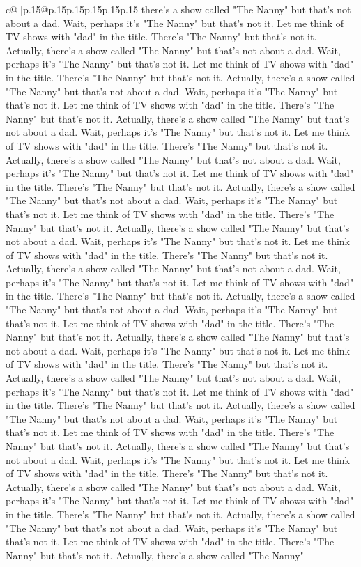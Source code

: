 \documentclass{article}
\begin{document}
{\begin{supertabular}{c@{$\;$}|p{.15\linewidth}@{}p{.15\linewidth}p{.15\linewidth}p{.15\linewidth}p{.15\linewidth}p{.15\linewidth}}
{{{there's a show called "The Nanny" but that's not about a dad. Wait, perhaps it's "The Nanny" but that's not it. Let me think of TV shows with "dad" in the title. There's "The Nanny" but that's not it. Actually, there's a show called "The Nanny" but that's not about a dad. Wait, perhaps it's "The Nanny" but that's not it. Let me think of TV shows with "dad" in the title. There's "The Nanny" but that's not it. Actually, there's a show called "The Nanny" but that's not about a dad. Wait, perhaps it's "The Nanny" but that's not it. Let me think of TV shows with "dad" in the title. There's "The Nanny" but that's not it. Actually, there's a show called "The Nanny" but that's not about a dad. Wait, perhaps it's "The Nanny" but that's not it. Let me think of TV shows with "dad" in the title. There's "The Nanny" but that's not it. Actually, there's a show called "The Nanny" but that's not about a dad. Wait, perhaps it's "The Nanny" but that's not it. Let me think of TV shows with "dad" in the title. There's "The Nanny" but that's not it. Actually, there's a show called "The Nanny" but that's not about a dad. Wait, perhaps it's "The Nanny" but that's not it. Let me think of TV shows with "dad" in the title. There's "The Nanny" but that's not it. Actually, there's a show called "The Nanny" but that's not about a dad. Wait, perhaps it's "The Nanny" but that's not it. Let me think of TV shows with "dad" in the title. There's "The Nanny" but that's not it. Actually, there's a show called "The Nanny" but that's not about a dad. Wait, perhaps it's "The Nanny" but that's not it. Let me think of TV shows with "dad" in the title. There's "The Nanny" but that's not it. Actually, there's a show called "The Nanny" but that's not about a dad. Wait, perhaps it's "The Nanny" but that's not it. Let me think of TV shows with "dad" in the title. There's "The Nanny" but that's not it. Actually, there's a show called "The Nanny" but that's not about a dad. Wait, perhaps it's "The Nanny" but that's not it. Let me think of TV shows with "dad" in the title. There's "The Nanny" but that's not it. Actually, there's a show called "The Nanny" but that's not about a dad. Wait, perhaps it's "The Nanny" but that's not it. Let me think of TV shows with "dad" in the title. There's "The Nanny" but that's not it. Actually, there's a show called "The Nanny" but that's not about a dad. Wait, perhaps it's "The Nanny" but that's not it. Let me think of TV shows with "dad" in the title. There's "The Nanny" but that's not it. Actually, there's a show called "The Nanny" but that's not about a dad. Wait, perhaps it's "The Nanny" but that's not it. Let me think of TV shows with "dad" in the title. There's "The Nanny" but that's not it. Actually, there's a show called "The Nanny" but that's not about a dad. Wait, perhaps it's "The Nanny" but that's not it. Let me think of TV shows with "dad" in the title. There's "The Nanny" but that's not it. Actually, there's a show called "The Nanny" but that's not about a dad. Wait, perhaps it's "The Nanny" but that's not it. Let me think of TV shows with "dad" in the title. There's "The Nanny" but that's not it. Actually, there's a show called "The Nanny" }}}
\end{supertabular}}
\end{document}

